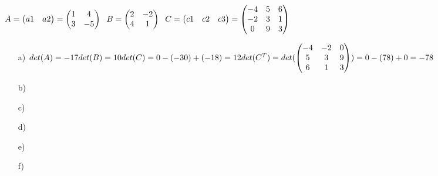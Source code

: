\subsection{}
\begin{math}
    A=\begin{pmatrix}
        a1 & a2
    \end{pmatrix}
    =\begin{pmatrix}
        1 & 4\\
        3 & -5
    \end{pmatrix}
    \hspace{6px}
    B=\begin{pmatrix}
        2 & -2\\
        4 & 1
    \end{pmatrix}
    \hspace{6px}
    C=\begin{pmatrix}
        c1 & c2 & c3
    \end{pmatrix}
    =\begin{pmatrix}
        -4 & 5 & 6\\
        -2 & 3 & 1\\
        0 & 9 & 3
    \end{pmatrix}
\end{math}
\begin{enumerate}
    \item[a)]
        \begin{math}
            det(A)
            =-17
            \\
            det(B)
            =10
            \\
            det(C)
            =0-(-30)+(-18)
            =12
            \\
            det(C^T)=det(\begin{pmatrix}
                -4 & -2 & 0\\
                5 & 3 & 9\\
                6 & 1 & 3
            \end{pmatrix})
            =0-(78)+0
            =-78
        \end{math}
    \item[b)]
        \begin{math}
        \end{math}
    \item[c)]
        \begin{math}
        \end{math}
    \item[d)]
        \begin{math}
        \end{math}
    \item[e)]
        \begin{math}
        \end{math}
    \item[f)]
        \begin{math}
        \end{math}
\end{enumerate}